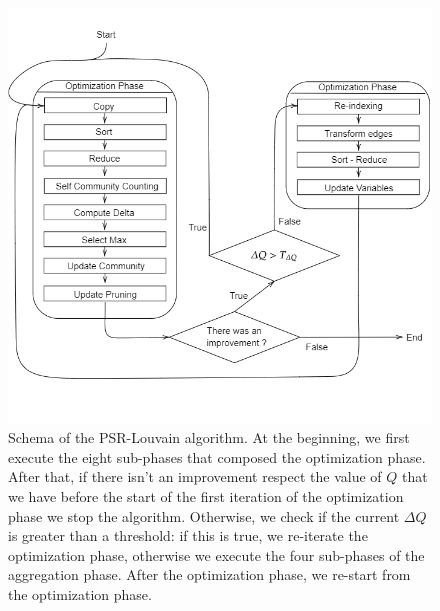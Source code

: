 \begin{figure}[t!]
	\centering
	\includegraphics[width=1\linewidth]{0-resources/PSR-Louvain-Schema}
	\caption{Schema of the PSR-Louvain algorithm. At the beginning, we first execute the eight sub-phases that composed the optimization phase. After that, if there isn't an improvement respect the value of $Q$ that we have before the start of the first iteration of the optimization phase we stop the algorithm. Otherwise, we check if the current $\Delta Q$ is greater than a threshold: if this is true, we re-iterate the optimization phase, otherwise we execute the four sub-phases of the aggregation phase. After the optimization phase, we re-start from the optimization phase.}
	\label{fig:psr-louvain-schema}
\end{figure}

